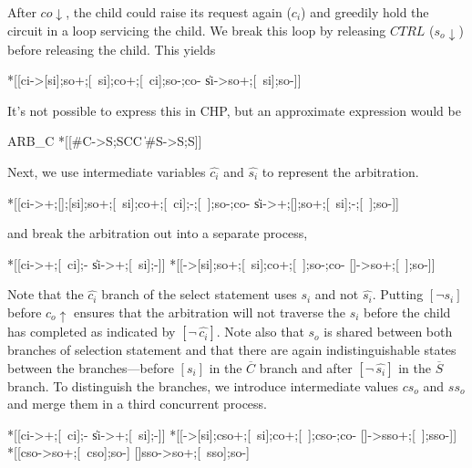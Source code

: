 \documentclass{article}
\begin{document}
\noindent After $co\!\downarrow$, the child could raise its request again ($c_i$) and greedily hold the circuit in a loop servicing the child. 
We break this loop by releasing $CTRL$ ($s_o\!\downarrow$) before releasing the child. This yields

\begin{hse}
*[[ci->[si];so+;[~si];co+;[~ci];so-;co-
  \|si->so+;[~si];so-]]
\end{hse}

\noindent It's not possible to express this in CHP, but an approximate expression would be

\begin{csp}
ARB_C\equiv
*[[#C->S;S\star\!C\star\!C
  \|#S->S;S]]
\end{csp}

\noindent Next, we use intermediate variables $\hat{c_i}$ and $\hat{s_i}$ to represent the arbitration.

\begin{hse}
*[[ci->+;[];[si];so+;[~si];co+;[~ci];-;[~];so-;co-
  \|si->+;[];so+;[~si];-;[~];so-]]
\end{hse}

\noindent and break the arbitration out into a separate process,

\begin{hse}
*[[ci->+;[~ci];-
  \|si->+;[~si];-]]\pll
*[[->[si];so+;[~si];co+;[~];so-;co-
  []->so+;[~];so-]]
\end{hse}

\noindent Note that the $\hat{c_i}$ branch of the select statement uses $s_i$ and not $\hat{s_i}$. Putting $[\neg\!s_i]$ before $c_o\!\uparrow$ ensures that the arbitration will not traverse the $s_i$ before the child has completed as indicated by $[\neg\,\hat{c_i}]$. 
Note also that $s_o$ is shared between both branches of selection statement and 
that there are again indistinguishable states between the branches---before $[s_i]$ in the $\overline{C}$ branch and after $[\neg\,\hat{s_i}]$ in the $\overline{S}$ branch.
To distinguish the branches, we introduce intermediate values $cs_o$ and $ss_o$ and merge them in a third concurrent process.

\begin{hse}
*[[ci->+;[~ci];-
  \|si->+;[~si];-]]\pll
*[[->[si];cso+;[~si];co+;[~];cso-;co-
  []->sso+;[~];sso-]]\pll
*[[cso->so+;[~cso];so-]
  []sso->so+;[~sso];so-]
\end{hse}
\end{document}
